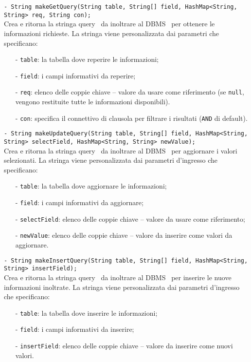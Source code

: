 {\begin{sloppypar}
{{{{\begin{itemize}
{				\texttt{- String makeGetQuery(String table, String[] field, HashMap<String, String> req, String con);}\\
				Crea e ritorna la stringa query\g~ da inoltrare al DBMS\g~ per ottenere le informazioni richieste.
				La stringa viene personalizzata dai parametri che specificano:
					\begin{itemize}
						\item[-] \texttt{table}: la tabella dove reperire le informazioni;
						\item[-] \texttt{field}: i campi informativi da reperire;
						\item[-] \texttt{req}: elenco delle coppie chiave – valore da usare come riferimento (se \texttt{null}, vengono restituite tutte le informazioni disponibili).
						\item[-] \texttt{con}: specifica il connettivo di clausola per filtrare i risultati (\texttt{AND} di default).\\
					\end{itemize}
				
				\texttt{- String makeUpdateQuery(String table, String[] field, HashMap<String, String> selectField, HashMap<String, String> newValue);}\\
				Crea e ritorna la stringa query\g~ da inoltrare al DBMS\g~ per aggiornare i valori selezionati.
				La stringa viene personalizzata dai parametri d'ingresso che specificano:
					\begin{itemize}
					\item[-] \texttt{table}: la tabella dove aggiornare le informazioni;
					\item[-] \texttt{field}: i campi informativi da aggiornare;
					\item[-] \texttt{selectField}: elenco delle coppie chiave – valore da usare come riferimento;
					\item[-] \texttt{newValue}: elenco delle coppie chiave – valore da inserire come valori da aggiornare.\\
					\end{itemize}
				
				\texttt{- String makeInsertQuery(String table, String[] field, HashMap<String, String> insertField);}\\
				Crea e ritorna la stringa query\g~ da inoltrare al DBMS\g~ per inserire le nuove informazioni inoltrate.
				La stringa viene personalizzata dai parametri d'ingresso che specificano:
					\begin{itemize}
					\item[-] \texttt{table}: la tabella dove inserire le informazioni;
					\item[-] \texttt{field}: i campi informativi da inserire;
					\item[-] \texttt{insertField}: elenco delle coppie chiave – valore da inserire come nuovi valori.\\
					\end{itemize}
				
}
\end{itemize}}}}}
\end{sloppypar}}
